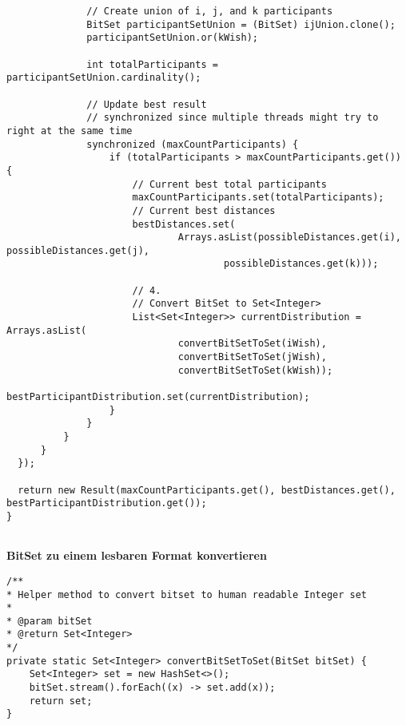 \documentclass[a4paper,10pt,ngerman]{scrartcl}
\begin{document}
\begin{lstlisting}
              // Create union of i, j, and k participants
              BitSet participantSetUnion = (BitSet) ijUnion.clone();
              participantSetUnion.or(kWish);

              int totalParticipants = participantSetUnion.cardinality();

              // Update best result
              // synchronized since multiple threads might try to right at the same time
              synchronized (maxCountParticipants) {
                  if (totalParticipants > maxCountParticipants.get()) {
                      // Current best total participants
                      maxCountParticipants.set(totalParticipants);
                      // Current best distances
                      bestDistances.set(
                              Arrays.asList(possibleDistances.get(i), possibleDistances.get(j),
                                      possibleDistances.get(k)));

                      // 4.
                      // Convert BitSet to Set<Integer>
                      List<Set<Integer>> currentDistribution = Arrays.asList(
                              convertBitSetToSet(iWish),
                              convertBitSetToSet(jWish),
                              convertBitSetToSet(kWish));
                      bestParticipantDistribution.set(currentDistribution);
                  }
              }
          }
      }
  });

  return new Result(maxCountParticipants.get(), bestDistances.get(), bestParticipantDistribution.get());
}
    
\end{lstlisting}

\textbf{BitSet zu einem lesbaren Format konvertieren}
\begin{lstlisting}
/**
* Helper method to convert bitset to human readable Integer set
* 
* @param bitSet
* @return Set<Integer>
*/
private static Set<Integer> convertBitSetToSet(BitSet bitSet) {
    Set<Integer> set = new HashSet<>();
    bitSet.stream().forEach((x) -> set.add(x));
    return set;
}
\end{lstlisting}
\end{document}
